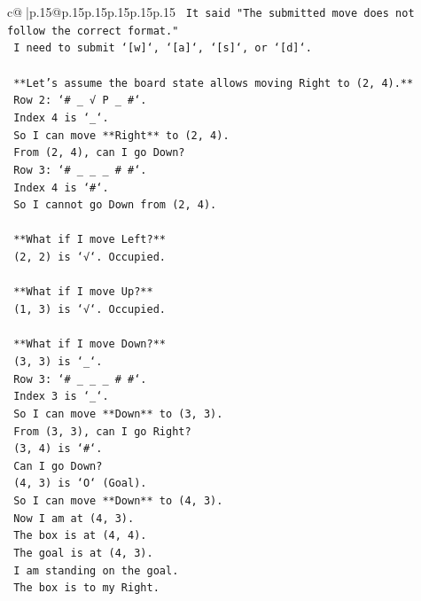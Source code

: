 \documentclass{article}
\begin{document}
{\begin{supertabular}{c@{$\;$}|p{.15\linewidth}@{}p{.15\linewidth}p{.15\linewidth}p{.15\linewidth}p{.15\linewidth}p{.15\linewidth}}
{{{\texttt{    It said "The submitted move does not follow the correct format."} \\
\texttt{    I need to submit `{[}w{]}`, `{[}a{]}`, `{[}s{]}`, or `{[}d{]}`.} \\
\\ 
\texttt{    **Let's assume the board state allows moving Right to (2, 4).**} \\
\texttt{    Row 2: `\# \_ √ P \_ \#`.} \\
\texttt{    Index 4 is `\_`.} \\
\texttt{    So I can move **Right** to (2, 4).} \\
\texttt{    From (2, 4), can I go Down?} \\
\texttt{    Row 3: `\# \_ \_ \_ \# \#`.} \\
\texttt{    Index 4 is `\#`.} \\
\texttt{    So I cannot go Down from (2, 4).} \\
\\ 
\texttt{    **What if I move Left?**} \\
\texttt{    (2, 2) is `√`. Occupied.} \\
\\ 
\texttt{    **What if I move Up?**} \\
\texttt{    (1, 3) is `√`. Occupied.} \\
\\ 
\texttt{    **What if I move Down?**} \\
\texttt{    (3, 3) is `\_`.} \\
\texttt{    Row 3: `\# \_ \_ \_ \# \#`.} \\
\texttt{    Index 3 is `\_`.} \\
\texttt{    So I can move **Down** to (3, 3).} \\
\texttt{    From (3, 3), can I go Right?} \\
\texttt{    (3, 4) is `\#`.} \\
\texttt{    Can I go Down?} \\
\texttt{    (4, 3) is `O` (Goal).} \\
\texttt{    So I can move **Down** to (4, 3).} \\
\texttt{    Now I am at (4, 3).} \\
\texttt{    The box is at (4, 4).} \\
\texttt{    The goal is at (4, 3).} \\
\texttt{    I am standing on the goal.} \\
\texttt{    The box is to my Right.} \\
}}}
\end{supertabular}}
\end{document}

